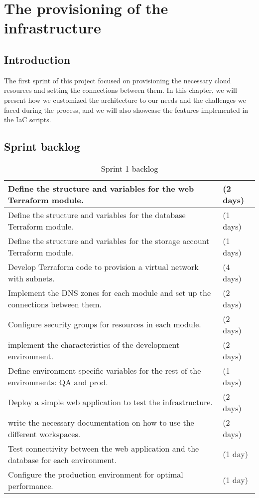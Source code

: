 \chapter{The provisioning of the infrastructure}

\section*{Introduction}
\noindent
The first sprint of this project focused on provisioning the necessary cloud resources and setting the connections between them. In this chapter, we will present how we customized the architecture to our needs and the challenges we faced during the process, and we will also showcase the features implemented in the IaC scripts.

\section{Sprint backlog}
\begin{longtable}[c]{
    |p{}|
    p{}|
    }
    \caption{Sprint 1 backlog}
    \label{tab:Sprint1_backlog}                                                                       \\
    \hline
    Define the structure and variables for the web Terraform module.                     & (2 days) \\
    \hline
    Define the structure and variables for the database Terraform module.                & (1 days) \\
    \hline
    Define the structure and variables for the storage account Terraform module.         & (1 days) \\
    \hline
    Develop Terraform code to provision a virtual network with subnets.                  & (4 days) \\
    \hline
    Implement the DNS zones for each module and set up the connections between them.     & (2 days) \\
    \hline
    Configure security groups for resources in each module.                              & (2 days) \\
    \hline
    implement the characteristics of the development environment.                        & (2 days) \\
    \hline
    Define environment-specific variables for the rest of the environments: QA and prod. & (1 days) \\
    \hline
    Deploy a simple web application to test the infrastructure.                          & (2 days) \\
    \hline
    write the necessary documentation on how to use the different workspaces.            & (2 days) \\
    \hline
    Test connectivity between the web application and the database for each environment. & (1 day)  \\
    \hline
    Configure the production environment for optimal performance.                        & (1 day)  \\
    \hline
\end{longtable}

